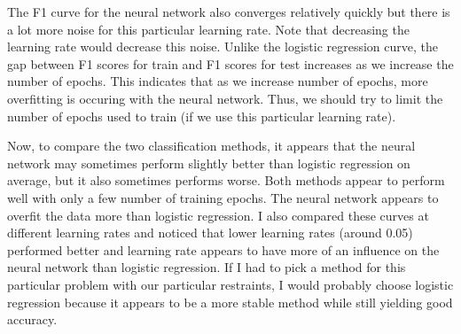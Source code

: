 \documentclass{article}
\newenvironment{soln}{
	\leavevmode\color{blue}\ignorespaces
}{}
\begin{document}
\begin{enumerate}
\begin{soln}
The F1 curve for the neural network also converges relatively quickly but there is a lot more noise for this particular learning rate. Note that decreasing the learning rate would decrease this noise. Unlike the logistic regression curve, the gap between F1 scores for train and F1 scores for test increases as we increase the number of epochs. This indicates that as we increase number of epochs, more overfitting is occuring with the neural network. Thus, we should try to limit the number of epochs used to train (if we use this particular learning rate). 

Now, to compare the two classification methods, it appears that the neural network may sometimes perform slightly better than logistic regression on average, but it also sometimes performs worse. Both methods appear to perform well with only a few number of training epochs. The neural network appears to overfit the data more than logistic regression. I also compared these curves at different learning rates and noticed that lower learning rates (around 0.05) performed better and learning rate appears to have more of an influence on the neural network than logistic regression. If I had to pick a method for this particular problem with our particular restraints, I would probably choose logistic regression because it appears to be a more stable method while still yielding good accuracy.

\end{soln}

\end{enumerate}
\end{document}
